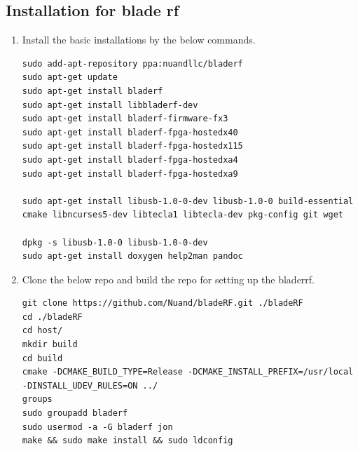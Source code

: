 \subsection{Installation for blade rf}
\begin{enumerate}
    \item Install the basic installations by the below commands.
\begin{lstlisting}
sudo add-apt-repository ppa:nuandllc/bladerf
sudo apt-get update
sudo apt-get install bladerf
sudo apt-get install libbladerf-dev
sudo apt-get install bladerf-firmware-fx3  
sudo apt-get install bladerf-fpga-hostedx40
sudo apt-get install bladerf-fpga-hostedx115
sudo apt-get install bladerf-fpga-hostedxa4
sudo apt-get install bladerf-fpga-hostedxa9

sudo apt-get install libusb-1.0-0-dev libusb-1.0-0 build-essential cmake libncurses5-dev libtecla1 libtecla-dev pkg-config git wget

dpkg -s libusb-1.0-0 libusb-1.0-0-dev
sudo apt-get install doxygen help2man pandoc
\end{lstlisting}

\item Clone the below repo and build the repo for setting up the bladerrf.
\begin{lstlisting}
git clone https://github.com/Nuand/bladeRF.git ./bladeRF
cd ./bladeRF
cd host/
mkdir build
cd build
cmake -DCMAKE_BUILD_TYPE=Release -DCMAKE_INSTALL_PREFIX=/usr/local -DINSTALL_UDEV_RULES=ON ../
groups
sudo groupadd bladerf
sudo usermod -a -G bladerf jon
make && sudo make install && sudo ldconfig
\end{lstlisting}
\end{enumerate}

